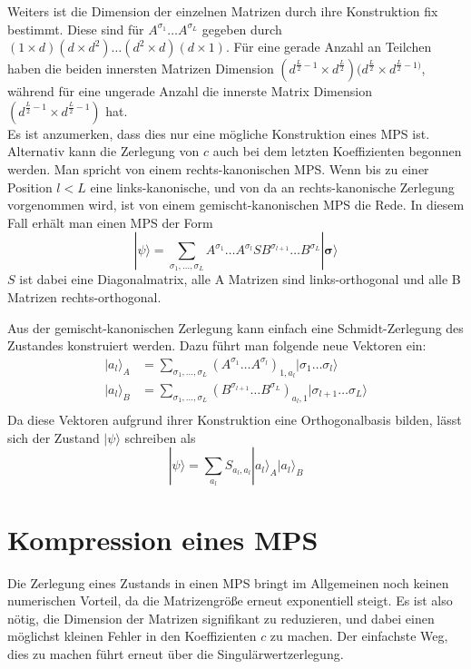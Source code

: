 \documentclass[10pt,a4paper]{report}
\newcommand{\SumIndex}{\sigma_1,\ldots,\sigma_L}
\begin{document}
Weiters ist die Dimension der einzelnen Matrizen durch ihre Konstruktion fix bestimmt. Diese sind für $A^{\sigma_1}\ldots A^{\sigma_L}$ gegeben durch $(1\times d)(d\times d^2)\ldots(d^2\times d)(d\times 1)$. Für eine gerade Anzahl an Teilchen haben die beiden innersten Matrizen Dimension $(d^{\frac{L}{2}-1}\times d^{\frac{L}{2}})(d^{\frac{L}{2}}\times d^{\frac{L}{2}-1)}$, während für eine ungerade Anzahl die innerste Matrix Dimension $(d^{\frac{L}{2}-1}\times d^{\frac{L}{2}-1})$ hat.\\

Es ist anzumerken, dass dies nur eine mögliche Konstruktion eines MPS ist. Alternativ kann die Zerlegung von $c$ auch bei dem letzten Koeffizienten begonnen werden. Man spricht von einem rechts-kanonischen MPS. Wenn bis zu einer Position $l<L$ eine links-kanonische, und von da an rechts-kanonische Zerlegung vorgenommen wird, ist von einem gemischt-kanonischen MPS die Rede. In diesem Fall erhält man einen MPS der Form
\begin{equation}
|\psi\rangle=\sum_{\SumIndex}A^{\sigma_1}\ldots A^{\sigma_l}S B^{\sigma_{l+1}}\ldots B^{\sigma_L}|\bm{\sigma}\rangle
\end{equation}
$S$ ist dabei eine Diagonalmatrix, alle A Matrizen sind links-orthogonal und alle B Matrizen rechts-orthogonal.

Aus der gemischt-kanonischen Zerlegung kann einfach eine Schmidt-Zerlegung des Zustandes konstruiert werden. Dazu führt man folgende neue Vektoren ein:
\begin{equation}
\begin{split}
|a_l\rangle_A&=\sum_{\SumIndex}(A^{\sigma_1}\ldots A^{\sigma_l})_{1,a_l}|\sigma_1\ldots\sigma_l\rangle \\
|a_l\rangle_B&=\sum_{\SumIndex}(B^{\sigma_{l+1}}\ldots B^{\sigma_L})_{a_l,1}|\sigma_{l+1}\ldots\sigma_L\rangle\\
\end{split}
\end{equation}
Da diese Vektoren aufgrund ihrer Konstruktion eine Orthogonalbasis bilden, lässt sich der Zustand $|\psi\rangle$ schreiben als
\begin{equation}\label{MPS_Schmidt_equ}
|\psi\rangle=\sum_{a_l}S_{a_l,a_l}|a_l\rangle_A|a_l\rangle_B
\end{equation}

\section{Kompression eines MPS}\label{compress}
Die Zerlegung eines Zustands in einen MPS bringt im Allgemeinen noch keinen numerischen Vorteil, da die Matrizengröße erneut exponentiell steigt. Es ist also nötig, die Dimension der Matrizen signifikant zu reduzieren, und dabei einen möglichst kleinen Fehler in den Koeffizienten $c$ zu machen. Der einfachste Weg, dies zu machen führt erneut über die Singulärwertzerlegung.\\
\end{document}
